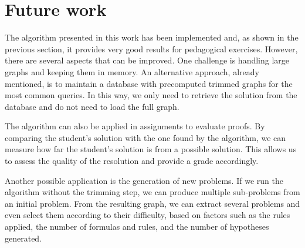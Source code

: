 \section{Future work}
The algorithm presented in this work has been implemented and, as shown in the previous section, it provides very good results for pedagogical exercises. However, there are several aspects that can be improved. One challenge is handling large graphs and keeping them in memory. An alternative approach, already mentioned, is to maintain a database with precomputed trimmed graphs for the most common queries. In this way, we only need to retrieve the solution from the database and do not need to load the full graph.

The algorithm can also be applied in assignments to evaluate proofs. By comparing the student's solution with the one found by the algorithm, we can measure how far the student's solution is from a possible solution. This allows us to assess the quality of the resolution and provide a grade accordingly.

Another possible application is the generation of new problems. If we run the algorithm without the trimming step, we can produce multiple sub-problems from an initial problem. From the resulting graph, we can extract several problems and even select them according to their difficulty, based on factors such as the rules applied, the number of formulas and rules, and the number of hypotheses generated.
